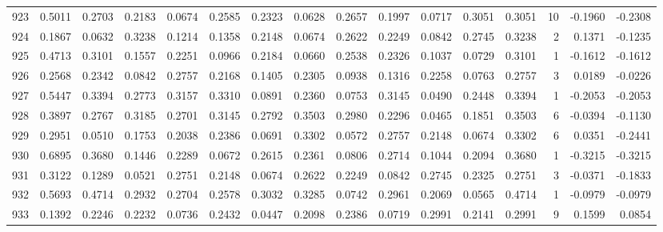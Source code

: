 \begin{tabular}{lrrrrrrrrrrrrrrr}
923 &      0.5011 &  0.2703 &  0.2183 &  0.0674 &  0.2585 &  0.2323 &  0.0628 &  0.2657 &  0.1997 &  0.0717 &   0.3051 &     0.3051 &     10 &                   -0.1960 &                    -0.2308 \\
924 &      0.1867 &  0.0632 &  0.3238 &  0.1214 &  0.1358 &  0.2148 &  0.0674 &  0.2622 &  0.2249 &  0.0842 &   0.2745 &     0.3238 &      2 &                    0.1371 &                    -0.1235 \\
925 &      0.4713 &  0.3101 &  0.1557 &  0.2251 &  0.0966 &  0.2184 &  0.0660 &  0.2538 &  0.2326 &  0.1037 &   0.0729 &     0.3101 &      1 &                   -0.1612 &                    -0.1612 \\
926 &      0.2568 &  0.2342 &  0.0842 &  0.2757 &  0.2168 &  0.1405 &  0.2305 &  0.0938 &  0.1316 &  0.2258 &   0.0763 &     0.2757 &      3 &                    0.0189 &                    -0.0226 \\
927 &      0.5447 &  0.3394 &  0.2773 &  0.3157 &  0.3310 &  0.0891 &  0.2360 &  0.0753 &  0.3145 &  0.0490 &   0.2448 &     0.3394 &      1 &                   -0.2053 &                    -0.2053 \\
928 &      0.3897 &  0.2767 &  0.3185 &  0.2701 &  0.3145 &  0.2792 &  0.3503 &  0.2980 &  0.2296 &  0.0465 &   0.1851 &     0.3503 &      6 &                   -0.0394 &                    -0.1130 \\
929 &      0.2951 &  0.0510 &  0.1753 &  0.2038 &  0.2386 &  0.0691 &  0.3302 &  0.0572 &  0.2757 &  0.2148 &   0.0674 &     0.3302 &      6 &                    0.0351 &                    -0.2441 \\
930 &      0.6895 &  0.3680 &  0.1446 &  0.2289 &  0.0672 &  0.2615 &  0.2361 &  0.0806 &  0.2714 &  0.1044 &   0.2094 &     0.3680 &      1 &                   -0.3215 &                    -0.3215 \\
931 &      0.3122 &  0.1289 &  0.0521 &  0.2751 &  0.2148 &  0.0674 &  0.2622 &  0.2249 &  0.0842 &  0.2745 &   0.2325 &     0.2751 &      3 &                   -0.0371 &                    -0.1833 \\
932 &      0.5693 &  0.4714 &  0.2932 &  0.2704 &  0.2578 &  0.3032 &  0.3285 &  0.0742 &  0.2961 &  0.2069 &   0.0565 &     0.4714 &      1 &                   -0.0979 &                    -0.0979 \\
933 &      0.1392 &  0.2246 &  0.2232 &  0.0736 &  0.2432 &  0.0447 &  0.2098 &  0.2386 &  0.0719 &  0.2991 &   0.2141 &     0.2991 &      9 &                    0.1599 &                     0.0854 \\

\end{tabular}
